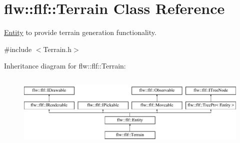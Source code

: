 \hypertarget{classflw_1_1flf_1_1Terrain}{}\section{flw\+:\+:flf\+:\+:Terrain Class Reference}
\label{classflw_1_1flf_1_1Terrain}


\hyperlink{classflw_1_1flf_1_1Entity}{Entity} to provide terrain generation functionality.  




{\ttfamily \#include $<$Terrain.\+h$>$}

Inheritance diagram for flw\+:\+:flf\+:\+:Terrain\+:\begin{figure}[H]
\begin{center}
\leavevmode
\includegraphics[height=3.589744cm]{classflw_1_1flf_1_1Terrain}
\end{center}
\end{figure}
